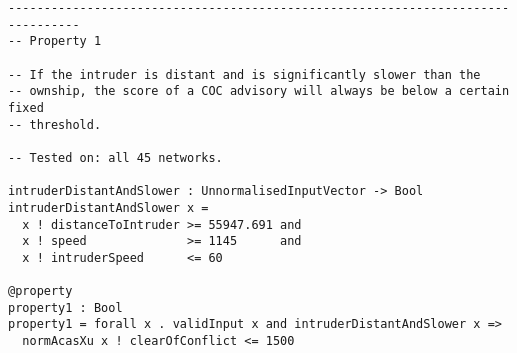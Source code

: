 \documentclass{article}
\begin{document}
\begin{verbatim}
--------------------------------------------------------------------------------
-- Property 1

-- If the intruder is distant and is significantly slower than the
-- ownship, the score of a COC advisory will always be below a certain fixed
-- threshold.

-- Tested on: all 45 networks.

intruderDistantAndSlower : UnnormalisedInputVector -> Bool
intruderDistantAndSlower x =
  x ! distanceToIntruder >= 55947.691 and
  x ! speed              >= 1145      and
  x ! intruderSpeed      <= 60

@property
property1 : Bool
property1 = forall x . validInput x and intruderDistantAndSlower x =>
  normAcasXu x ! clearOfConflict <= 1500
\end{verbatim}
\end{document}
